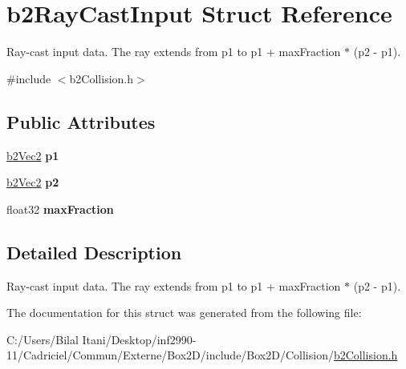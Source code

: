 \hypertarget{structb2_ray_cast_input}{}\section{b2\+Ray\+Cast\+Input Struct Reference}
\label{structb2_ray_cast_input}


Ray-\/cast input data. The ray extends from p1 to p1 + max\+Fraction $\ast$ (p2 -\/ p1).  




{\ttfamily \#include $<$b2\+Collision.\+h$>$}

\subsection*{Public Attributes}
\begin{DoxyCompactItemize}
\item 
\hyperlink{structb2_vec2}{b2\+Vec2} {\bfseries p1}\hypertarget{structb2_ray_cast_input_a7254a7062422833b1124fa464ab4caf3}{}\label{structb2_ray_cast_input_a7254a7062422833b1124fa464ab4caf3}

\item 
\hyperlink{structb2_vec2}{b2\+Vec2} {\bfseries p2}\hypertarget{structb2_ray_cast_input_a850102c843469781a3a627c871043d0b}{}\label{structb2_ray_cast_input_a850102c843469781a3a627c871043d0b}

\item 
float32 {\bfseries max\+Fraction}\hypertarget{structb2_ray_cast_input_acb5c88e0ef2c3716a1334611522ab0b2}{}\label{structb2_ray_cast_input_acb5c88e0ef2c3716a1334611522ab0b2}

\end{DoxyCompactItemize}


\subsection{Detailed Description}
Ray-\/cast input data. The ray extends from p1 to p1 + max\+Fraction $\ast$ (p2 -\/ p1). 

The documentation for this struct was generated from the following file\+:\begin{DoxyCompactItemize}
\item 
C\+:/\+Users/\+Bilal Itani/\+Desktop/inf2990-\/11/\+Cadriciel/\+Commun/\+Externe/\+Box2\+D/include/\+Box2\+D/\+Collision/\hyperlink{b2_collision_8h}{b2\+Collision.\+h}\end{DoxyCompactItemize}

